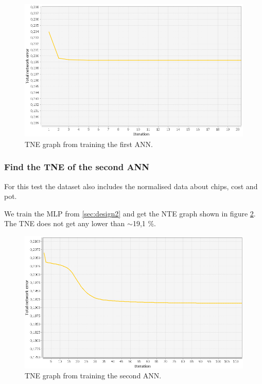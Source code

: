 \begin{figure}[H]
  \center
    \includegraphics[scale=0.6]{images/nn/default-nn1-err.png}
  \caption{TNE graph from training the first ANN.\label{fig:tneg1}}
\end{figure}

\subsubsection{Find the TNE of the second ANN}
\label{sec:ann-test2}
For this test the dataset also includes the normalised data about chips, cost and pot.

We train the MLP from \ref{sec:design2} and get the NTE graph shown in figure \ref{fig:tneg2}. The TNE does not get any lower than $\sim$19,1 \%.

\begin{figure}[H]
  \center
    \includegraphics[scale=0.6]{images/nn/default-nn2-err.png}
  \caption{TNE graph from training the second ANN.\label{fig:tneg2}}
\end{figure}

